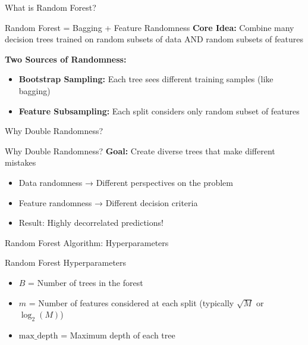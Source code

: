 \documentclass[9pt]{beamer}
\begin{document}
\begin{frame}{What is Random Forest?}
\begin{definitionbox}{Random Forest = Bagging + Feature Randomness}
\textbf{Core Idea:} Combine many decision trees trained on random subsets of data AND random subsets of features
\end{definitionbox}

\begin{keypointsbox}
\textbf{Two Sources of Randomness:}
\begin{itemize}
\item \textbf{Bootstrap Sampling:} Each tree sees different training samples (like bagging)
\item \textbf{Feature Subsampling:} Each split considers only random subset of features
\end{itemize}
\end{keypointsbox}
\end{frame}

\begin{frame}{Why Double Randomness?}
\begin{examplebox}{Why Double Randomness?}
\textbf{Goal:} Create diverse trees that make different mistakes
\begin{itemize}
\item Data randomness → Different perspectives on the problem
\item Feature randomness → Different decision criteria
\item Result: Highly decorrelated predictions!
\end{itemize}
\end{examplebox}
\end{frame}

\begin{frame}{Random Forest Algorithm: Hyperparameters}
\begin{definitionbox}{Random Forest Hyperparameters}
\begin{itemize}
\item $B$ = Number of trees in the forest
\item $m$ = Number of features considered at each split (typically $\sqrt{M}$ or $\log_2(M)$)
\item $\text{max\_depth}$ = Maximum depth of each tree
\end{itemize}
\end{definitionbox}
\end{frame}
\end{document}
